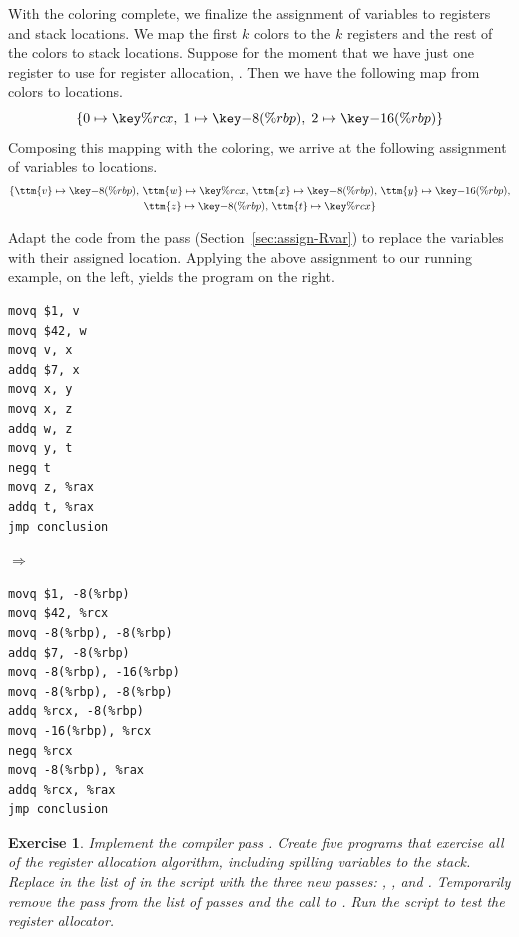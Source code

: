 \documentclass[11pt]{book}
\newtheorem{exercise}[theorem]{Exercise}
\begin{document}
With the coloring complete, we finalize the assignment of variables to
registers and stack locations. We map the first $k$ colors to the $k$
registers and the rest of the colors to stack locations.  Suppose for
the moment that we have just one register to use for register
allocation, . Then we have the following map from colors to
locations.
\[
  \{ 0 \mapsto \key{\%rcx}, \; 1 \mapsto \key{-8(\%rbp)}, \; 2 \mapsto \key{-16(\%rbp)} \}
\]
Composing this mapping with the coloring, we arrive at the following
assignment of variables to locations.
\begin{gather*}
  \{ \ttm{v} \mapsto \key{-8(\%rbp)}, \,
     \ttm{w} \mapsto \key{\%rcx},  \,
     \ttm{x} \mapsto \key{-8(\%rbp)}, \,
     \ttm{y} \mapsto \key{-16(\%rbp)}, \\
     \ttm{z} \mapsto \key{-8(\%rbp)}, \,
     \ttm{t} \mapsto \key{\%rcx} \}
\end{gather*}

Adapt the code from the  pass
(Section~\ref{sec:assign-Rvar}) to replace the variables with their
assigned location. Applying the above assignment to our running
example, on the left, yields the program on the right.
\begin{center}
  \begin{minipage}{0.3\textwidth}
\begin{lstlisting}
movq $1, v
movq $42, w
movq v, x
addq $7, x
movq x, y
movq x, z
addq w, z
movq y, t
negq t
movq z, %rax
addq t, %rax
jmp conclusion
\end{lstlisting}
\end{minipage}
$\Rightarrow\qquad$
\begin{minipage}{0.45\textwidth}
\begin{lstlisting}
movq $1, -8(%rbp)
movq $42, %rcx
movq -8(%rbp), -8(%rbp)
addq $7, -8(%rbp)
movq -8(%rbp), -16(%rbp)
movq -8(%rbp), -8(%rbp)
addq %rcx, -8(%rbp)
movq -16(%rbp), %rcx
negq %rcx
movq -8(%rbp), %rax
addq %rcx, %rax
jmp conclusion
\end{lstlisting}
\end{minipage}
\end{center}

\begin{exercise}\normalfont
%
Implement the compiler pass .
%
Create five programs that exercise all of the register allocation
algorithm, including spilling variables to the stack.
%
Replace  in the list of  in the
 script with the three new passes:
, , and
.
%
Temporarily remove the  pass from the list of passes
and the call to .
%
Run the script to test the register allocator.
\end{exercise}
\end{document}
